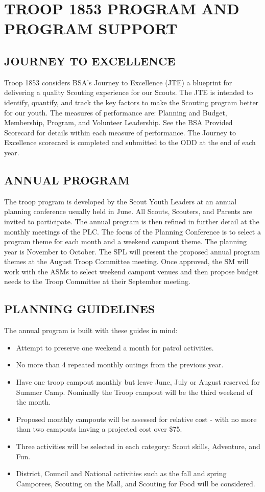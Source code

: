 \documentclass{ltxguide}
\begin{document}
\section{TROOP 1853 PROGRAM AND PROGRAM SUPPORT}
\subsection{JOURNEY TO EXCELLENCE}
Troop 1853 considers \ac{BSA}'s Journey to Excellence (JTE) a blueprint for delivering a quality Scouting experience for our Scouts. The JTE is intended to identify, quantify, and track the key factors to make the Scouting program better for our youth. The measures of performance are: Planning and Budget, Membership, Program, and Volunteer Leadership. See the \ac{BSA} Provided Scorecard for details within each measure of performance. The Journey to Excellence scorecard is completed and submitted to the \ac{ODD} at the end of each year.

\subsection{ANNUAL PROGRAM}
The troop program is developed by the Scout Youth Leaders at an annual planning conference usually held in June. All Scouts, Scouters, and Parents are invited to participate. The annual program is then refined in further detail at the monthly meetings of the \ac{PLC}. The focus of the Planning Conference is to select a program theme for each month and a weekend campout theme. The planning year is November to October. The \ac{SPL} will present the proposed annual program themes at the August Troop Committee meeting. Once approved, the SM will work with the ASMs to select weekend campout venues and then propose budget needs to the Troop Committee at their September meeting.

\subsection{PLANNING GUIDELINES}
The annual program is built with these guides in mind:
\begin{itemize}	
	\item Attempt to preserve one weekend a month for patrol activities.
	\item No more than 4 repeated monthly outings from the previous year.
	\item Have one troop campout monthly but leave June, July or August reserved for Summer Camp. Nominally the Troop campout will be the third weekend of the month.
	\item Proposed monthly campouts will be assessed for relative cost - with no more than two campouts having a projected cost over \$75.
	\item Three activities will be selected in each category: Scout skills, Adventure, and Fun.
	\item District, Council and National activities such as the fall and spring Camporees, Scouting on the Mall, and Scouting for Food will be considered.
\end{itemize}
\end{document}
